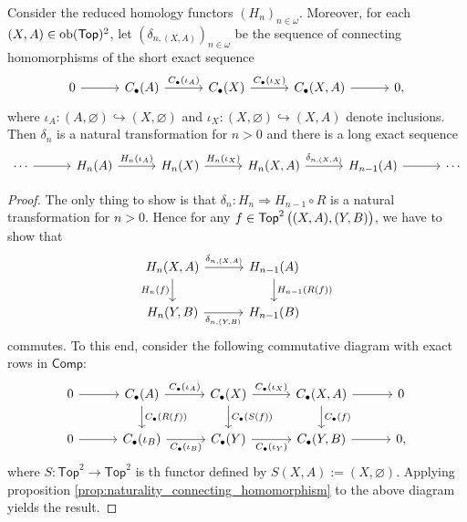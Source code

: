 \begin{corollary}
	Consider the reduced homology functors $(H_n)_{n \in \omega}$. Moreover, for each $(X,A) \in \operatorname{ob}(\mathsf{Top})^2$, let $(\delta_{n,(X,A)})_{n \in \omega}$ be the sequence of connecting homomorphisms of the short exact sequence 
	\begin{equation*}
		\begin{tikzcd}[column sep = 7ex]
			0 \arrow[r] & C_\bullet(A) \arrow[r,"C_\bullet(\iota_A)"] & C_\bullet(X) \arrow[r,"C_\bullet(\iota_X)"] & C_\bullet(X,A) \arrow[r] & 0,
		\end{tikzcd}
	\end{equation*}
	\noindent where $\iota_A : (A,\varnothing) \hookrightarrow (X,\varnothing)$ and $\iota_X : (X,\varnothing) \hookrightarrow (X,A)$ denote inclusions. Then $\delta_n$ is a natural transformation for $n > 0$ and there is a long exact sequence
\begin{equation*}
	\begin{tikzcd}[column sep=7ex]
	\cdots \arrow[r] & H_n(A) \arrow[r,"H_n(\iota_A)"] & H_n(X) \arrow[r,"H_n(\iota_X)"] & H_n(X,A) \arrow[r,"\delta_{n,(X,A)}"] & H_{n - 1}(A) \arrow[r] & \cdots
	\end{tikzcd}
\end{equation*}

\end{corollary}

\begin{proof}
	The only thing to show is that $\delta_n : H_n \Rightarrow H_{n - 1} \circ R$ is a natural transformation for $n > 0$. Hence for any $f \in \mathsf{Top}^2\del[1]{(X,A),(Y,B)}$, we have to show that
	\begin{equation*}
		\begin{tikzcd}[column sep=7ex]
			H_n(X,A) \arrow[r,"\delta_{n,(X,A)}"]\arrow[d,"H_n(f)"'] & H_{n - 1}(A)\arrow[d,"H_{n-1}(R(f))"]\\
			H_n(Y,B) \arrow[r,"\delta_{n,(Y,B)}"']& H_{n - 1}(B)
		\end{tikzcd}
	\end{equation*}
	\noindent commutes. To this end, consider the following commutative diagram with exact rows in $\mathsf{Comp}$: 
	\begin{equation*}
		\begin{tikzcd}[column sep=7ex]
			0 \arrow[r] & C_\bullet(A) \arrow[r,"C_\bullet(\iota_A)"]\arrow[d,"C_\bullet(R(f))"] & C_\bullet(X) \arrow[r,"C_\bullet(\iota_X)"]\arrow[d,"C_\bullet(S(f))"] & C_\bullet(X,A) \arrow[r]\arrow[d,"C_\bullet(f)"] & 0\\
			0 \arrow[r] & C_\bullet(\iota_B) \arrow[r,"C_\bullet(\iota_B)"'] & C_\bullet(Y) \arrow[r,"C_\bullet(\iota_Y)"'] & C_\bullet(Y,B) \arrow[r] & 0,
		\end{tikzcd}
	\end{equation*}
	\noindent where $S : \mathsf{Top}^2 \to \mathsf{Top}^2$ is th functor defined by $S(X,A) := (X,\varnothing)$. Applying proposition \ref{prop:naturality_connecting_homomorphism} to the above diagram yields the result.
\end{proof}


